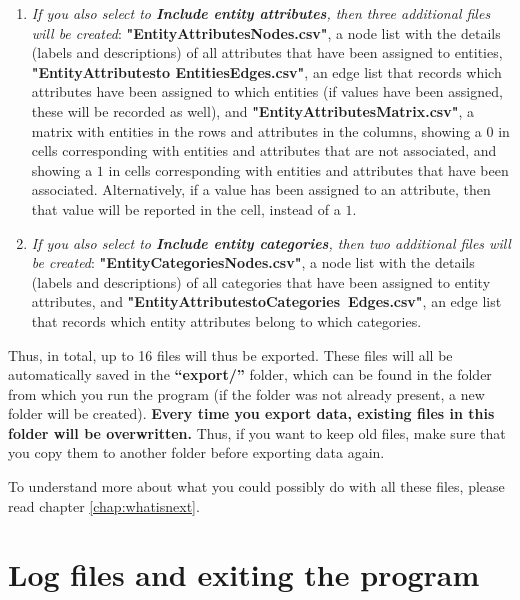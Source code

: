 \documentclass{memoir}
\begin{document}
\begin{enumerate}
\item{\emph{If you also select to \textbf{Include entity attributes}, then three additional files will be created}: \textbf{"Entity\textunderscore Attributes\textunderscore Nodes.csv"}, a node list with the details (labels and descriptions) of all attributes that have been assigned to entities, \textbf{"Entity\textunderscore Attributes\textunderscore to \textunderscore Entities\textunderscore Edges.csv"}, an edge list that records which attributes have been assigned to which entities (if values have been assigned, these will be recorded as well), and \textbf{"Entity\textunderscore Attributes\textunderscore Matrix.csv"}, a matrix with entities in the rows and attributes in the columns, showing a \(0\) in cells corresponding with entities and attributes that are not associated, and showing a \(1\) in cells corresponding with entities and attributes that have been associated. Alternatively, if a value has been assigned to an attribute, then that value will be reported in the cell, instead of a \(1\).}
\item{\emph{If you also select to \textbf{Include entity categories}, then two additional files will be created}: \textbf{"Entity\textunderscore Categories\textunderscore Nodes.csv"}, a node list with the details (labels and descriptions) of all categories that have been assigned to entity attributes, and \textbf{"Entity\textunderscore Attributes\textunderscore to\textunderscore Categories\textunderscore \ Edges.csv"}, an edge list that records which entity attributes belong to which categories.}
\end{enumerate}

Thus, in total, up to 16 files will thus be exported. These files will all be automatically saved in the \textbf{``export/''} folder, which can be found in the folder from which you run the program (if the folder was not already present, a new folder will be created). \textbf{Every time you export data, existing files in this folder will be overwritten.} Thus, if you want to keep old files, make sure that you copy them to another folder before exporting data again.

To understand more about what you could possibly do with all these files, please read chapter \ref{chap:whatisnext}.


\section{Log files and exiting the program}
\label{sec:logfilesandexiting}
\end{document}
